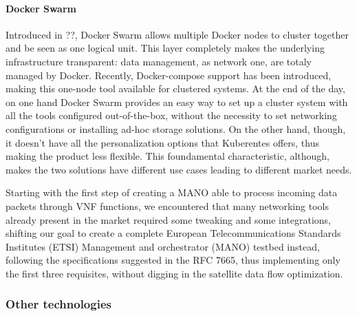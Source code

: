 \documentclass[10pt]{book}
\begin{document}
\paragraph{Docker Swarm} Introduced in ??, Docker Swarm allows multiple Docker nodes to cluster together and be
seen as one logical unit. This layer completely makes the underlying
infrastructure transparent: data management, as network one, are totaly managed
by Docker. Recently, Docker-compose support has been introduced, making
this one-node tool available for clustered systems. At the end of the day, on
one hand Docker Swarm provides an easy way to set up a cluster system with all
the tools configured out-of-the-box, without the necessity to set networking
configurations or installing ad-hoc storage solutions. On the other hand,
though, it doesn't have all the personalization options that Kuberentes offers,
thus making the product less flexible. This foundamental characteristic,
although, makes the two solutions have different use cases leading to different
market needs.
\vspace{0.5cm}

Starting with the first step of creating a MANO able to process incoming data 
packets through VNF functions, we encountered that many networking tools already 
present in the market required some tweaking and some integrations, shifting our 
goal to create a complete  European Telecommunications Standards Institutes 
(ETSI) Management and orchestrator (MANO) testbed instead, following the 
specifications suggested in the RFC 7665, thus implementing only the first three 
requisites, without digging in the satellite data flow optimization.

\subsubsection{Other technologies}
\end{document}
